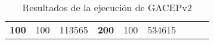 \begin{table}[]
\begin{tabular}{|ccrccrccc}
\multicolumn{1}{|c|}{\multirow{-39}{*}{\cellcolor[HTML]{FFFFC7}\textbf{100}}} & \multicolumn{1}{c|}{\multirow{-9}{*}{\cellcolor[HTML]{DDFDFF}100}} & \multicolumn{1}{r|}{\cellcolor[HTML]{DAE8FC}113565}    & \multicolumn{1}{c|}{\multirow{-39}{*}{\cellcolor[HTML]{FFFFC7}\textbf{200}}} & \multicolumn{1}{c|}{\multirow{-10}{*}{\cellcolor[HTML]{DDFDFF}100}} & \multicolumn{1}{r|}{\cellcolor[HTML]{DDFDFF}534615}    &                                                                              &                                                                    &                                                        \\ \cline{1-6}
\end{tabular}
\caption{\label{GACEPv2}Resultados de la ejecución de GACEPv2}
\end{table}

